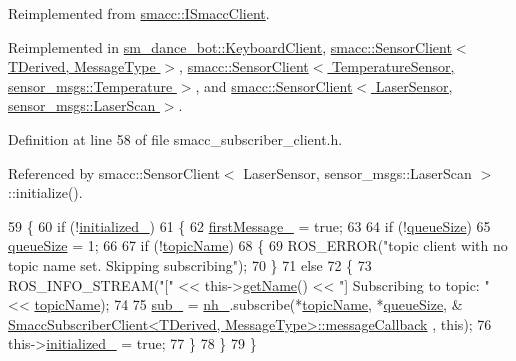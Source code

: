 Reimplemented from \hyperlink{classsmacc_1_1ISmaccClient_a974ebb6ad6cf812e7b9de6b78b3d901f}{smacc\+::\+I\+Smacc\+Client}.



Reimplemented in \hyperlink{classsm__dance__bot_1_1KeyboardClient_ad2fd8228e41b257c187ebef2d2a308fd}{sm\+\_\+dance\+\_\+bot\+::\+Keyboard\+Client}, \hyperlink{classsmacc_1_1SensorClient_ab772bc1d3e1db37a39d3d1992b06cec2}{smacc\+::\+Sensor\+Client$<$ T\+Derived, Message\+Type $>$}, \hyperlink{classsmacc_1_1SensorClient_ab772bc1d3e1db37a39d3d1992b06cec2}{smacc\+::\+Sensor\+Client$<$ Temperature\+Sensor, sensor\+\_\+msgs\+::\+Temperature $>$}, and \hyperlink{classsmacc_1_1SensorClient_ab772bc1d3e1db37a39d3d1992b06cec2}{smacc\+::\+Sensor\+Client$<$ Laser\+Sensor, sensor\+\_\+msgs\+::\+Laser\+Scan $>$}.



Definition at line 58 of file smacc\+\_\+subscriber\+\_\+client.\+h.



Referenced by smacc\+::\+Sensor\+Client$<$ Laser\+Sensor, sensor\+\_\+msgs\+::\+Laser\+Scan $>$\+::initialize().


\begin{DoxyCode}
59   \{
60     \textcolor{keywordflow}{if} (!\hyperlink{classsmacc_1_1SmaccSubscriberClient_a38ca48bff3e170c1cfd6acff9da7661c}{initialized\_})
61     \{
62       \hyperlink{classsmacc_1_1SmaccSubscriberClient_acfb1bf9d488d40a55c61861e2bc39346}{firstMessage\_} = \textcolor{keyword}{true};
63 
64       \textcolor{keywordflow}{if} (!\hyperlink{classsmacc_1_1SmaccSubscriberClient_ac75e9d490c0383a7a686f05b2d4fcc68}{queueSize})
65         \hyperlink{classsmacc_1_1SmaccSubscriberClient_ac75e9d490c0383a7a686f05b2d4fcc68}{queueSize} = 1;
66 
67       \textcolor{keywordflow}{if} (!\hyperlink{classsmacc_1_1SmaccSubscriberClient_a573625f4b97228c0e9110fb4538722f2}{topicName})
68       \{
69         ROS\_ERROR(\textcolor{stringliteral}{"topic client with no topic name set. Skipping subscribing"});
70       \}
71       \textcolor{keywordflow}{else}
72       \{
73         ROS\_INFO\_STREAM(\textcolor{stringliteral}{"["} << this->\hyperlink{classsmacc_1_1ISmaccClient_a20846aabfd1de832aa27d7a8237a1742}{getName}() << \textcolor{stringliteral}{"] Subscribing to topic: "} << 
      \hyperlink{classsmacc_1_1SmaccSubscriberClient_a573625f4b97228c0e9110fb4538722f2}{topicName});
74 
75         \hyperlink{classsmacc_1_1SmaccSubscriberClient_a1570353cc228141c8a401776e2ef31c9}{sub\_} = \hyperlink{classsmacc_1_1SmaccSubscriberClient_a687bdd388ad68d5831138e7eb70fb9ae}{nh\_}.subscribe(*\hyperlink{classsmacc_1_1SmaccSubscriberClient_a573625f4b97228c0e9110fb4538722f2}{topicName}, *\hyperlink{classsmacc_1_1SmaccSubscriberClient_ac75e9d490c0383a7a686f05b2d4fcc68}{queueSize}, &
      \hyperlink{classsmacc_1_1SmaccSubscriberClient_aeeaa8569c2abca5ec9639f975d2c4226}{SmaccSubscriberClient<TDerived, MessageType>::messageCallback}
      , \textcolor{keyword}{this});
76         this->\hyperlink{classsmacc_1_1SmaccSubscriberClient_a38ca48bff3e170c1cfd6acff9da7661c}{initialized\_} = \textcolor{keyword}{true};
77       \}
78     \}
79   \}
\end{DoxyCode}


